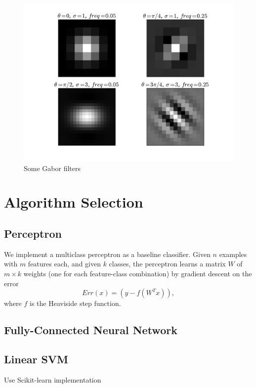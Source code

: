 \documentclass{acm_proc_article-sp}
\begin{document}
\begin{figure}[h]
	\centering
	\includegraphics[width=\linewidth]{gabors}
  	\caption{Some Gabor filters}
  	\label{fig:gabor}
\end{figure}


\section{Algorithm Selection}%
\subsection{Perceptron}
We implement a multiclass perceptron as a baseline classifier. Given $n$ examples with $m$ features each, and given $k$ classes, the perceptron learns a matrix $W$ of $m \times k$ weights (one for each feature-class combination) by gradient descent on the error $$Err(x) = (y - f(W^Tx)),$$
where $f$ is the Heaviside step function.

\subsection{Fully-Connected Neural Network}

\subsection{Linear SVM}
Use Scikit-learn implementation \cite{scikit-learn}
\end{document}
